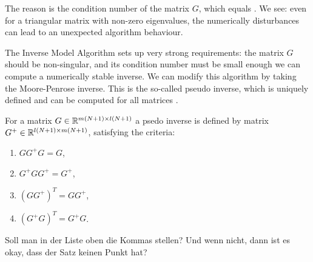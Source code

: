 \begin{exam}
	The reason is the condition number of the matrix $G$, which equals \badCondNb. We see: even for a triangular matrix with non-zero eigenvalues, the numerically disturbances can lead to an unexpected algorithm behaviour. 
		
\end{exam}

The Inverse Model Algorithm sets up very strong requirements: the matrix $G$ should be non-singular, and its condition number must be small enough we can compute a numerically stable inverse. 
We can modify this algorithm by taking the Moore-Penrose inverse. This is the so-called pseudo inverse, which is uniquely defined and can be computed for all matrices \cite{LAAG}. 

\begin{defi}
	For a matrix $G \in {\mathbb{R}}^{m(N+1) \times l(N+1)}$ a psedo inverse is defined by matrix $G^+ \in {\mathbb{R}}^{l(N+1) \times m(N+1)}$, satisfying the criteria: 
	\begin{enumerate}
		\item $G G^+ G  = G $,
		\item $G^+ G G^+ = G^+$,
		\item $(G G^+)^T = G G^+$,
		\item $(G^+ G)^T = G^+ G$.
	\end{enumerate}
\end{defi}
{\color{red} Soll man in der Liste oben die Kommas stellen? Und wenn nicht, dann ist es okay, dass der Satz keinen Punkt hat?} 


